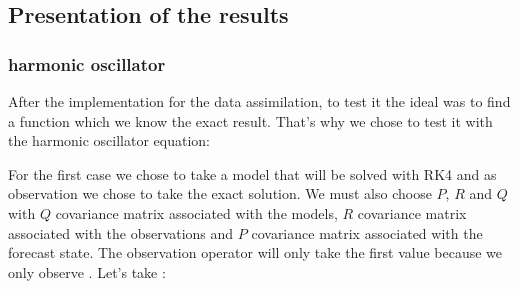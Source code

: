 \subsection{Presentation of the results}
\subsubsection{harmonic oscillator}
\noindent After the implementation for the data assimilation, to test it the ideal was to find a function which we know the exact result. That's why we chose to test it with the harmonic oscillator equation:



For the first case we chose to take a model that will be solved with RK4 and as observation we chose to take the exact solution. We must also choose $P$, $R$ and $Q$ with $Q$ covariance matrix associated with the models, $R$ covariance matrix associated with the observations and $P$ covariance matrix associated with the forecast state.
The observation operator will only take the first value because we only observe .
Let's take :

